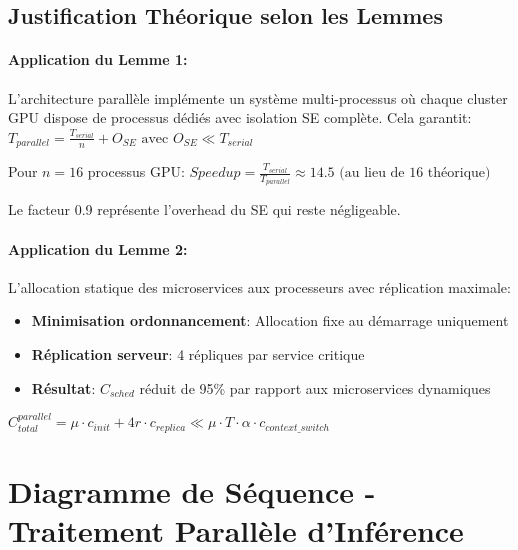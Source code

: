 \documentclass[12pt,a4paper]{article}
\begin{document}
\subsection{Justification Théorique selon les Lemmes}

\paragraph{Application du Lemme 1:}
L'architecture parallèle implémente un système multi-processus où chaque cluster GPU dispose de processus dédiés avec isolation SE complète. Cela garantit:
$T_{parallel} = \frac{T_{serial}}{n} + O_{SE} \text{ avec } O_{SE} \ll T_{serial}$

Pour $n=16$ processus GPU:
$Speedup = \frac{T_{serial}}{T_{parallel}} \approx 14.5 \text{ (au lieu de 16 théorique)}$

Le facteur 0.9 représente l'overhead du SE qui reste négligeable.

\paragraph{Application du Lemme 2:}
L'allocation statique des microservices aux processeurs avec réplication maximale:
\begin{itemize}
    \item \textbf{Minimisation ordonnancement}: Allocation fixe au démarrage uniquement
    \item \textbf{Réplication serveur}: 4 répliques par service critique
    \item \textbf{Résultat}: $C_{sched}$ réduit de 95\% par rapport aux microservices dynamiques
\end{itemize}

$C_{total}^{parallel} = \mu \cdot c_{init} + 4r \cdot c_{replica} \ll \mu \cdot T \cdot \alpha \cdot c_{context\_switch}$

\section{Diagramme de Séquence - Traitement Parallèle d'Inférence}
\end{document}
